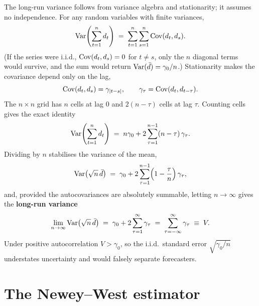 The long-run variance follows from variance algebra and stationarity; it assumes no
independence. For any random variables with finite variances,
\begin{equation}
  \operatorname{Var}\!\left(\sum_{t=1}^{n} d_t\right)
  \;=\; \sum_{t=1}^{n}\sum_{s=1}^{n} \operatorname{Cov}(d_t, d_s).
\end{equation}
(If the series were i.i.d., $\operatorname{Cov}(d_t,d_s)=0$ for $t\neq s$, only the $n$ diagonal
terms would survive, and the sum would return $\operatorname{Var}(\bar{d})=\gamma_0/n$.) Stationarity
makes the covariance depend only on the lag,
\begin{equation}
  \operatorname{Cov}(d_t, d_s) = \gamma_{|t-s|},
  \qquad \gamma_\tau = \operatorname{Cov}(d_t, d_{t-\tau}).
\end{equation}
The $n\times n$ grid has $n$ cells at lag $0$ and $2(n-\tau)$ cells at lag $\tau$.
Counting cells gives the exact identity
\begin{equation}
  \operatorname{Var}\!\left(\sum_{t=1}^{n} d_t\right)
  \;=\; n\gamma_0 + 2\sum_{\tau=1}^{n-1}(n-\tau)\,\gamma_\tau .
\end{equation}
Dividing by $n$ stabilises the variance of the mean,
\begin{equation}
  \operatorname{Var}\!\left(\sqrt{n}\,\bar{d}\right)
  \;=\; \gamma_0 + 2\sum_{\tau=1}^{n-1}\!\left(1 - \frac{\tau}{n}\right)\gamma_\tau ,
\end{equation}
and, provided the autocovariances are absolutely summable, letting $n\to\infty$ gives the
\textbf{long-run variance}
\begin{equation}
  \lim_{n\to\infty}\operatorname{Var}\!\left(\sqrt{n}\,\bar{d}\right)
  \;=\; \gamma_0 + 2\sum_{\tau=1}^{\infty}\gamma_\tau
  \;=\; \sum_{\tau=-\infty}^{\infty}\gamma_\tau
  \;\equiv\; V .
\end{equation}
Under positive autocorrelation $V > \gamma_0$, so the i.i.d.\ standard error
$\sqrt{\gamma_0/n}$ understates uncertainty and would falsely separate forecasters.

\section{The Newey--West estimator}
\label{sec:nw}

